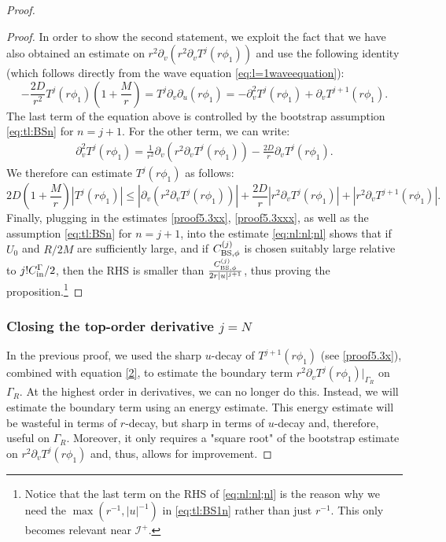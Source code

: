 \documentclass[11pt,english]{article}
\numberwithin{equation}{section}
\theoremstyle{remark}
\theoremstyle{plain}
\theoremstyle{remark}
\newcommand{\pu}{\partial_u}
\newcommand{\pv}{\partial_v}
\renewcommand{\(}{\left(}
\renewcommand{\)}{\right)}
\newcommand{\pho}{(r\phi_1)}
\begin{document}
\begin{proof}
\begin{proof}
In order to show the second statement, we exploit the fact that we have also obtained an estimate on $r^2\pv(r^2 \pv T^j\pho)$ and use the following identity (which follows directly from the wave equation \eqref{eq:l=1waveequation}):
\begin{equation}\label{eq:waveequationtoestimatephi}
-\frac{2D}{r^2}T^j\pho\left(1+\frac{M}{r}\right)=T^j\pv\pu (r\phi_1)=-\pv^2T^j\pho+\pv T^{j+1}\pho.
\end{equation} 
The last term of the equation above is controlled by the bootstrap assumption \eqref{eq:tl:BSn} for $n=j+1$. For the other term, we can write:
\begin{align*}
\pv^2T^j\pho=\frac{1}{r^2}\pv\left(r^2\pv T^j\pho\right)-\frac{2D}{r}\pv T^{j}\pho.
\end{align*}
We therefore can estimate $T^j\pho$ as follows:
\begin{equation}\label{eq:nl:nl;nl}
2D\left(1+\frac{M}{r}\right)\left|T^j(r\phi_1)\right|\leq \left|\pv\left(r^2\pv T^j\pho\right)\right|+\frac{2D}{r}\left|r^2\pv T^{j}\pho\right|+\left|r^2\pv T^{j+1}\pho\right|.
\end{equation}
Finally, plugging in the estimates \eqref{proof5.3xx}, \eqref{proof5.3xxx}, as well as the assumption \eqref{eq:tl:BSn} for $n=j+1$, into the estimate \eqref{eq:nl:nl;nl} shows that if $U_0$ and $R/2M$ are sufficiently large, and if $C_{\mathrm{BS},\phi}^{(j)}$ is chosen suitably large relative to $j!C_{\mathrm{in}}^\Gamma/2$, then the RHS is smaller than $\frac{C_{\mathrm{BS},\phi}^{(j)}}{2r|u|^{j+1}}$, thus proving the proposition.\footnote{Notice that the last term on the RHS of \eqref{eq:nl:nl;nl} is the reason why we need the $\max\left(r^{-1},|u|^{-1}\right)$ in \eqref{eq:tl:BS1n} rather than just $r^{-1}$. This only becomes relevant near $\mathcal{I}^+$.}
\end{proof}

\subsubsection{Closing the top-order derivative \texorpdfstring{$j=N$}{j=N}}\label{sec:subsubsec:timelikej=N}
In the previous proof, we used the sharp $u$-decay of $T^{j+1}\pho$ (see \eqref{proof5.3x}), combined with equation \eqref{2}, to estimate the boundary term $r^2\pv T^j\pho|_{\Gamma_R}$ on $\Gamma_R$. 
At the highest order in derivatives, we can no longer do this. 
Instead, we will estimate the boundary term using an energy estimate. This energy estimate will be wasteful in terms of $r$-decay, but sharp in terms of $u$-decay and, therefore, useful on $\Gamma_R$. Moreover, it only requires a "square root" of the bootstrap estimate on $r^2\pv T^j\pho$ and, thus, allows for improvement.


\end{proof}
\end{document}
